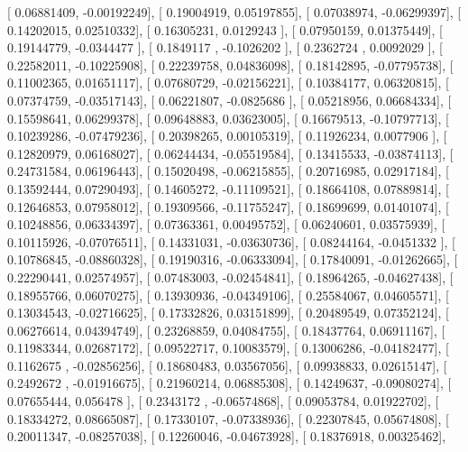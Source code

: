 \documentclass{article}
\begin{document}
       [ 0.06881409, -0.00192249],
       [ 0.19004919,  0.05197855],
       [ 0.07038974, -0.06299397],
       [ 0.14202015,  0.02510332],
       [ 0.16305231,  0.0129243 ],
       [ 0.07950159,  0.01375449],
       [ 0.19144779, -0.0344477 ],
       [ 0.1849117 , -0.1026202 ],
       [ 0.2362724 ,  0.0092029 ],
       [ 0.22582011, -0.10225908],
       [ 0.22239758,  0.04836098],
       [ 0.18142895, -0.07795738],
       [ 0.11002365,  0.01651117],
       [ 0.07680729, -0.02156221],
       [ 0.10384177,  0.06320815],
       [ 0.07374759, -0.03517143],
       [ 0.06221807, -0.0825686 ],
       [ 0.05218956,  0.06684334],
       [ 0.15598641,  0.06299378],
       [ 0.09648883,  0.03623005],
       [ 0.16679513, -0.10797713],
       [ 0.10239286, -0.07479236],
       [ 0.20398265,  0.00105319],
       [ 0.11926234,  0.0077906 ],
       [ 0.12820979,  0.06168027],
       [ 0.06244434, -0.05519584],
       [ 0.13415533, -0.03874113],
       [ 0.24731584,  0.06196443],
       [ 0.15020498, -0.06215855],
       [ 0.20716985,  0.02917184],
       [ 0.13592444,  0.07290493],
       [ 0.14605272, -0.11109521],
       [ 0.18664108,  0.07889814],
       [ 0.12646853,  0.07958012],
       [ 0.19309566, -0.11755247],
       [ 0.18699699,  0.01401074],
       [ 0.10248856,  0.06334397],
       [ 0.07363361,  0.00495752],
       [ 0.06240601,  0.03575939],
       [ 0.10115926, -0.07076511],
       [ 0.14331031, -0.03630736],
       [ 0.08244164, -0.0451332 ],
       [ 0.10786845, -0.08860328],
       [ 0.19190316, -0.06333094],
       [ 0.17840091, -0.01262665],
       [ 0.22290441,  0.02574957],
       [ 0.07483003, -0.02454841],
       [ 0.18964265, -0.04627438],
       [ 0.18955766,  0.06070275],
       [ 0.13930936, -0.04349106],
       [ 0.25584067,  0.04605571],
       [ 0.13034543, -0.02716625],
       [ 0.17332826,  0.03151899],
       [ 0.20489549,  0.07352124],
       [ 0.06276614,  0.04394749],
       [ 0.23268859,  0.04084755],
       [ 0.18437764,  0.06911167],
       [ 0.11983344,  0.02687172],
       [ 0.09522717,  0.10083579],
       [ 0.13006286, -0.04182477],
       [ 0.1162675 , -0.02856256],
       [ 0.18680483,  0.03567056],
       [ 0.09938833,  0.02615147],
       [ 0.2492672 , -0.01916675],
       [ 0.21960214,  0.06885308],
       [ 0.14249637, -0.09080274],
       [ 0.07655444,  0.056478  ],
       [ 0.2343172 , -0.06574868],
       [ 0.09053784,  0.01922702],
       [ 0.18334272,  0.08665087],
       [ 0.17330107, -0.07338936],
       [ 0.22307845,  0.05674808],
       [ 0.20011347, -0.08257038],
       [ 0.12260046, -0.04673928],
       [ 0.18376918,  0.00325462],
\end{document}
